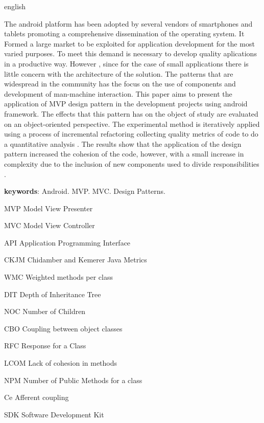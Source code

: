 \documentclass[
	12pt,				%
	a4paper,			%
	english,			%
	spanish,			%
	brazil,				%
	]{abntex2}
\begin{document}
\begin{resumo}[Abstract]
 \begin{otherlanguage*}{english}

The android platform has been adopted by several vendors of smartphones and
tablets promoting a comprehensive dissemination of the operating system.
It Formed a large market to be exploited for application development
for the most varied purposes. To meet this demand is necessary to develop
quality aplications in a productive way. However , since for the case
of small applications there is little concern with the architecture of the solution.
The patterns that are widespread in the community has the focus on the use of
components and development of man-machine interaction. This paper aims to present the
application of MVP design pattern in the development projects using android
framework. The effects that this pattern has on the object of study are
evaluated on an object-oriented perspective. The experimental method is
iteratively applied using a  process of incremental refactoring collecting
quality metrics of code to do a quantitative analysis .
The results show that the application of the design pattern increased the
cohesion of the code, however, with a small increase in complexity due to the inclusion of new
components used to divide responsibilities .

 \vspace{\onelineskip}

 \noindent
 \textbf{keywords}: Android. MVP. MVC. Design Patterns.
 \end{otherlanguage*}
\end{resumo}


\listoffigures*
\cleardoublepage

\listoftables*
\cleardoublepage

\begin{siglas}
	\item[MVP] 	Model View Presenter
  	\item[MVC]	Model View Controller
  	\item[API] 	Application Programming Interface
  	\item[CKJM] Chidamber and Kemerer Java Metrics
   	\item[WMC] 	Weighted methods per class
 	\item[DIT] 	Depth of Inheritance Tree
 	\item[NOC] 	Number of Children
 	\item[CBO] 	Coupling between object classes
 	\item[RFC] 	Response for a Class
 	\item[LCOM] Lack of cohesion in methods
   	\item[NPM] 	Number of Public Methods for a class
\item[Ce]Afferent coupling
\item[SDK] Software Development Kit


\end{siglas}
\end{document}
